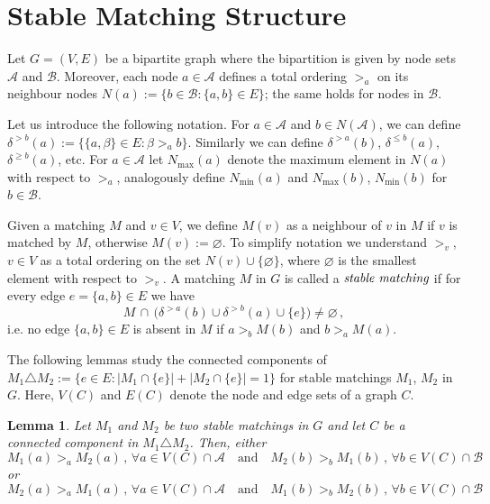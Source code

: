 \documentclass[preprint]{elsarticle}
\newtheorem{lemma}[fact]{Lemma}
\begin{document}
\section{Stable Matching Structure}

Let $G = (V, E)$ be a bipartite graph  where the bipartition is given by node sets $\mathcal{A}$ and $\mathcal{B}$. Moreover, each node $a\in\mathcal{A}$ defines a total ordering $>_a$ on its neighbour nodes $N(a):=\{b \in\mathcal{B}: \{a,b\}\in E\}$;  the same holds for nodes in $\mathcal{B}$.

Let us introduce the following notation. For $a\in \mathcal{A}$ and $b \in N(\mathcal{A})$, we can define $\delta^{>b}(a):=\{ \{a,\beta\}\in E: \beta>_a b \}$. Similarly we can define $\delta^{>a}(b)$, $\delta^{\leq b}(a)$, $\delta^{\geq b}(a)$, etc. For $a\in \mathcal{A}$ let $N_{\max}(a)$ denote the maximum element in $N(a)$ with respect to $>_a$, analogously define $N_{\min}(a)$ and $N_{\max}(b)$, $N_{\min}(b)$ for $b\in\mathcal{B}$. 

Given a matching $M$ and $v\in V$, we define $M(v)$ as a neighbour of $v$ in $M$ if $v$ is matched by $M$, otherwise $M(v):=\varnothing$. To simplify notation we understand $>_v$, $v\in V$ as a total ordering on the set $N(v)\cup\{\varnothing\}$, where $\varnothing$ is the smallest element with respect to $>_v$.
A matching $M$ in $G$ is called a $\emph{stable matching}$ if for every edge $e=\{a,b\}\in E$ we have
\begin{equation}\label{eq:stability_def}
		M \, \cap \, \big(\delta^{>a}(b) \cup \delta^{>b}(a) \cup  \{e\} \big)\neq\varnothing\,,
\end{equation}
i.e. no edge $\{a,b\}\in E$ is absent in $M$  if $a>_b M(b)$ and $b>_a M(a)$.


The following lemmas study the connected components of $M_1\triangle M_2:=\{ e\in E: |M_1\cap \{e\}|+|M_2\cap \{e\}|=1\}$ for stable matchings $M_1$, $M_2$ in $G$. Here, $V(C)$ and $E(C)$ denote the node and edge sets of a graph $C$.

\begin{lemma}\label{lemma:pref}
Let $M_1$ and $M_2$ be two stable matchings in $G$ and let $C$ be a connected component in $M_1 \triangle M_2$. Then, either
\begin{equation}\label{eq:pref_first}
	M_1(a)>_a M_2(a)\,,\,\forall a\in V(C) \cap\mathcal{A}\quad \text{and} \quad  M_2(b)>_b M_1(b)\,,\,  \forall b\in V(C) \cap\mathcal{B}
\end{equation}
or 
\begin{equation}\label{eq:pref_second}
	M_2(a)>_a M_1(a)\,,\,\forall a\in V(C) \cap\mathcal{A}\quad \text{and} \quad  M_1(b)>_b M_2(b)\,,\,  \forall b\in V(C) \cap\mathcal{B}
\end{equation}
\end{lemma}
\end{document}
